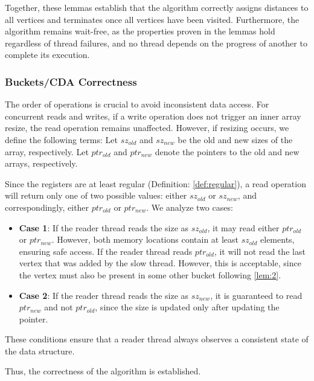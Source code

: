 Together, these lemmas establish that the algorithm correctly assigns distances to all vertices and terminates once all vertices have been visited. Furthermore, the algorithm remains wait-free, as the properties proven in the lemmas hold regardless of thread failures, and no thread depends on the progress of another to complete its execution.

\subsubsection{Buckets/CDA Correctness}

The order of operations is crucial to avoid inconsistent data access. For concurrent reads and writes, if a write operation does not trigger an inner array resize, the read operation remains unaffected. However, if resizing occurs, we define the following terms: Let $sz_{old}$ and $sz_{new}$ be the old and new sizes of the array, respectively. Let $ptr_{old}$ and $ptr_{new}$ denote the pointers to the old and new arrays, respectively.  

Since the registers are at least regular (Definition: \ref{def:regular}), a read operation will return only one of two possible values: either $sz_{old}$ or $sz_{new}$, and correspondingly, either $ptr_{old}$ or $ptr_{new}$. We analyze two cases:

\begin{itemize}
    \item \textbf{Case 1}: If the reader thread reads the size as $sz_{old}$, it may read either $ptr_{old}$ or $ptr_{new}$. However, both memory locations contain at least $sz_{old}$ elements, ensuring safe access.  If the reader thread reads $ptr_{old}$, it will not read the last vertex that was added by the slow thread. However, this is acceptable, since the vertex must also be present in some other bucket following \ref{lem:2}.
    
    \item \textbf{Case 2}: If the reader thread reads the size as $sz_{new}$, it is guaranteed to read $ptr_{new}$ and not $ptr_{old}$, since the size is updated only after updating the pointer.
\end{itemize}

These conditions ensure that a reader thread always observes a consistent state of the data structure.

Thus, the correctness of the algorithm is established.

